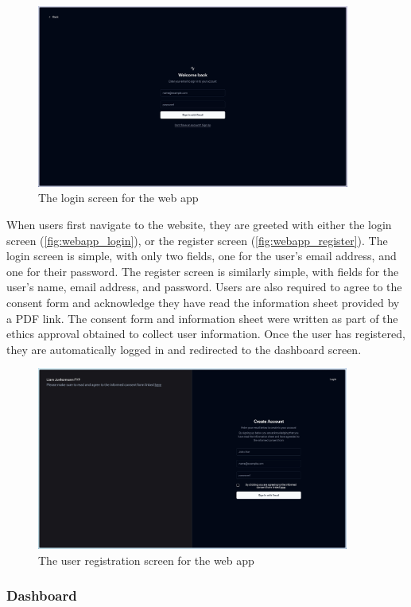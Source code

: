 \begin{figure}[htbp]
  \centering
  \includegraphics[height=6cm]{figures/fyp_login.jpeg}
  \captionsetup{justification=centering}
  \caption[Web app Login]{The login screen for the web app} \label{fig:webapp_login}
\end{figure}
When users first navigate to the website, they are greeted with either the login screen (\autoref{fig:webapp_login}), or the register screen (\autoref{fig:webapp_register}). The login screen is simple, with only two fields, one for the user's email address, and one for their password. The register screen is similarly simple, with fields for the user's name, email address, and password. Users are also required to agree to the consent form and acknowledge they have read the information sheet provided by a PDF link. The consent form and information sheet were written as part of the ethics approval obtained to collect user information. Once the user has registered, they are automatically logged in and redirected to the dashboard screen.
\begin{figure}[htbp]
  \centering
  \includegraphics[height=6cm]{figures/fyp_register.jpeg}
  \captionsetup{justification=centering}
  \caption[Web app Register]{The user registration screen for the web app} \label{fig:webapp_register}
\end{figure}
\subsubsection{Dashboard}

